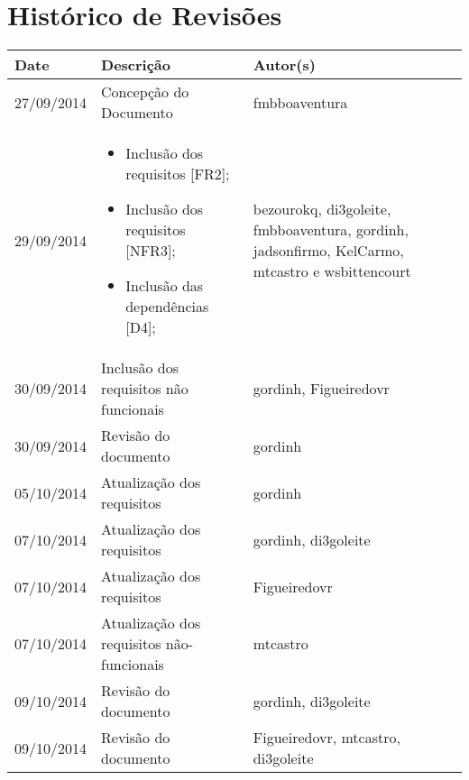 \documentclass{article}
\begin{document}

\capa
\newpage

\section*{\center Histórico de Revisões}
  \vspace*{1cm}
  \begin{table}[ht]
    \centering
    \begin{tabular}[pos]{|m{2cm} | m{7.2cm} | m{3.8cm}|}
      \hline
      \cellcolor[gray]{0.9}
      \textbf{Date} & \cellcolor[gray]{0.9}\textbf{Descrição} & \cellcolor[gray]{0.9}\textbf{Autor(s)}\\ \hline
      \hline
      \small 27/09/2014 & \small Concepção do Documento & \small fmbboaventura \\ \hline
      \small 29/09/2014 &
      \begin{small}
        \begin{itemize}
          \item Inclusão dos requisitos [FR2];
          \item Inclusão dos requisitos [NFR3];
          \item Inclusão das dependências [D4];
        \end{itemize}
      \end{small} & \small bezourokq, di3goleite, fmbboaventura, gordinh, jadsonfirmo, KelCarmo, mtcastro e wsbittencourt \\ \hline
      \small 30/09/2014 & \small Inclusão dos requisitos não funcionais & \small gordinh, Figueiredovr \\ \hline
      \small 30/09/2014 & \small Revisão do documento & \small gordinh \\ \hline
      \small 05/10/2014 & \small Atualização dos requisitos & \small gordinh \\ \hline
      \small 07/10/2014 & \small Atualização dos requisitos & \small gordinh, di3goleite \\ \hline
      \small 07/10/2014 & \small Atualização dos requisitos & \small Figueiredovr \\ \hline
      \small 07/10/2014 & \small Atualização dos requisitos não-funcionais & \small mtcastro \\ \hline
      \small 09/10/2014 & \small Revisão do documento & \small gordinh, di3goleite \\ \hline
      \small 09/10/2014 & \small Revisão do documento & \small Figueiredovr, mtcastro, di3goleite \\ \hline
    \end{tabular}
  \end{table}
\end{document}
